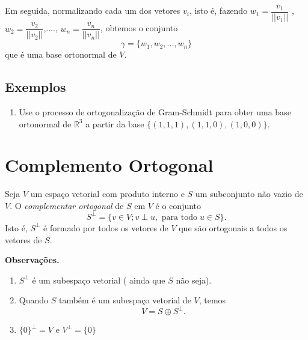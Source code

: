 Em seguida, normalizando cada um dos vetores $v_i$, isto é, fazendo
$w_1 = \dfrac{v_1}{||v_1||}$ , $w_2= \dfrac{v_2}{||v_2||}$,...., $ w_n = \dfrac{v_n}{||v_n||}$, obtemos  o conjunto  $$\gamma =\{ w_1, w_2, ..., w_n \}$$ que é uma base ortonormal de $V$.


%
%
%
\subsection{Exemplos}

\begin{enumerate}
\item Use o processo de ortogonalização de Gram-Schmidt para obter uma base ortonormal de $\mathbb{R}^3$ a partir da base $ \{ (1,1,1), (1,1,0), (1,0,0)\}$.


\end{enumerate}

\section{Complemento Ortogonal}

Seja $V$ um espaço vetorial com produto interno e $S$ um subconjunto  não vazio de $V$. O  \textit{complementar ortogonal } de $S$ em $V$ é o conjunto
$$ S^{\perp}=\{ v \in V; v \perp u, \text{ para todo} \; u \in S\}.$$
Isto é, $S^{\perp}$ é formado por todos os vetores de $V$ que são ortogonais a todos os vetores de $S$.



\vspace{0.7cm}
\noindent \textbf{Observações.}

\begin{enumerate}
\item  $S^{\perp}$ é um subespaço vetorial ( ainda que $S$ não seja).
\item Quando $S$ também é um subespaço vetorial de $V$, temos  $$V=S\oplus S^{\perp}.$$

\item   $\{0\}^{\perp}=V$ e $V^{\perp}=\{0\}$
\end{enumerate}

